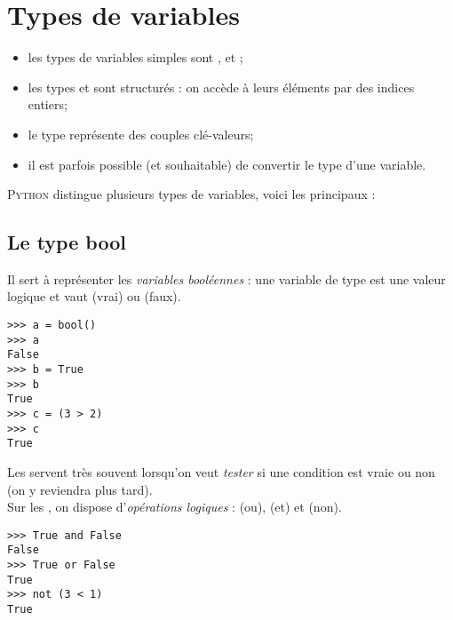 \chapter{Types de variables}
\begin{aretenir}
    \begin{itemize}
        \item 	les types de variables simples sont ,  et ;
        \item 	les types  et  sont structurés : on accède à leurs éléments par des indices entiers;
        \item 	le type  représente des couples \og clé-valeurs\fg{};
        \item 	il est parfois possible (et souhaitable) de convertir le type d'une variable.
    \end{itemize}
\end{aretenir}
\textsc{Python} distingue plusieurs types de variables, voici les principaux :
\section{Le type bool}
Il sert à représenter les \textit{variables booléennes} : une variable de type  est une valeur logique et vaut  (vrai) ou
 (faux).


\begin{pys}\begin{verbatim}
>>> a = bool()
>>> a
False
>>> b = True
>>> b
True
>>> c = (3 > 2)
>>> c
True
\end{verbatim}
\end{pys}

Les  servent très souvent lorsqu'on veut \textit{tester} si une condition est vraie ou non (on y reviendra plus tard).\\
Sur les , on dispose d'\textit{opérations logiques} :  (ou),  (et) et  (non).

\begin{pys}\begin{verbatim}
>>> True and False
False
>>> True or False
True
>>> not (3 < 1)
True
\end{verbatim}
\end{pys}



